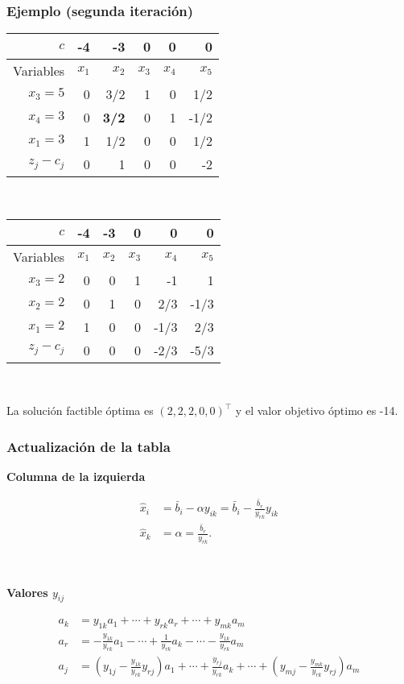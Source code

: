 \documentclass{beamer}
\begin{document}
\begin{frame}
\frametitle{Ejemplo (segunda iteración)}

\begin{center}
\begin{tabular}{r | rrrrr}
$c$ & -4 & -3 & 0 & 0 & 0 \\ \hline
Variables & $x_1$ & $x_2$ & $x_3$ & $x_4$ & $x_5$ \\ \hline
$x_3=5$ & 0 & 3/2 & 1 & 0 & 1/2 \\
$x_4=3$   & 0 & \textbf{3/2} & 0 & 1 & -1/2  \\
$x_1=3$ & 1 & 1/2 & 0 & 0 & 1/2 \\ \hline
$z_j-c_j$ &  0 & 1 & 0 & 0 & -2 
\end{tabular}
\end{center}

\

\begin{center}
\begin{tabular}{r | rrrrr}
$c$ & -4 & -3 & 0 & 0 & 0 \\ \hline
Variables & $x_1$ & $x_2$ & $x_3$ & $x_4$ & $x_5$ \\ \hline
$x_3=2$ & 0 & 0 & 1 & -1 & 1 \\
$x_2=2$   & 0 & 1 & 0 & 2/3 & -1/3  \\
$x_1=2$ & 1 & 0 & 0 & -1/3 & 2/3 \\ \hline
$z_j-c_j$ &  0 & 0 & 0 & -2/3 & -5/3 
\end{tabular}
\end{center}

\

La solución factible óptima es $(2,2,2,0,0)^\top$ y el valor objetivo óptimo es -14.


\end{frame}
\begin{frame}
\frametitle{Actualización de la tabla}

\textbf{Columna de la izquierda}

\begin{align*}
\hat{x}_i &= \bar{b}_i - \alpha y_{ik} = \bar{b}_i - \frac{\bar{b}_r}{y_{rk}} y_{ik}\\
\hat{x}_k &= \alpha = \frac{\bar{b}_r}{y_{rk}}.
\end{align*}

\

\textbf{Valores $y_{ij}$}

\begin{align*}
a_k &= y_{1k}a_1 +\cdots + y_{rk}a_r + \cdots + y_{mk} a_m\\
a_r &= -\frac{y_{1k}}{y_{rk}}a_1-\cdots + \frac{1}{y_{rk}}a_k - \cdots - \frac{y_{1k}}{y_{rk}}a_m\\
a_j &= \left(y_{1j} - \frac{y_{1k}}{y_{rk}} y_{rj}\right)a_1 + \cdots + \frac{y_{rj}}{y_{rk}}a_k + \cdots + \left(y_{mj} - \frac{y_{mk}}{y_{rk}} y_{rj}\right)a_m
\end{align*}








\end{frame}
\end{document}
